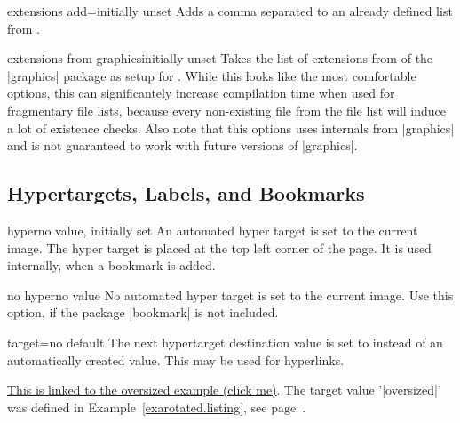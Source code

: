 \documentclass[a4paper,11pt]{ltxdoc}
\begin{document}
\begin{docIgrKey}[][doc new=2021-10-16]{extensions add}{=}{initially unset}
  Adds a comma separated  to an already defined list from
  .
\end{docIgrKey}


\begin{docIgrKey}[][doc new=2021-10-16]{extensions from graphics}{}{initially unset}
  Takes the list of extensions from 
  of the |graphics| \cite{package:graphicx} package as setup for .
  While this looks like the most comfortable options, this can significantely
  increase compilation time when used for fragmentary file lists, because
  every non-existing file from the file list will induce a lot of existence checks.
  Also note that this options uses internals from |graphics| and is not
  guaranteed to work with future versions of |graphics|.
\end{docIgrKey}


\clearpage
\subsection{Hypertargets, Labels, and Bookmarks}

\begin{docIgrKey}{hyper}{}{no value, initially set}
  An automated hyper target is set to the current image. The hyper target is placed
  at the top left corner of the page. It is used internally, when a bookmark is added.
\end{docIgrKey}

\begin{docIgrKey}{no hyper}{}{no value}
  No automated hyper target is set to the current image. Use this option, if
  the package |bookmark| is not included.
\end{docIgrKey}

\begin{docIgrKey}{target}{=}{no default}
  The next hypertarget destination value is set to  instead of
  an automatically created value. This may be used for hyperlinks.
\begin{dispExample}
\hyperlink{oversized}{This is linked to the oversized example (click me)}.
The target value '|oversized|' was defined in Example~\ref{exarotated.listing},
see page~\pageref{exarotated.listing}.
\end{dispExample}
\end{docIgrKey}
\end{document}
